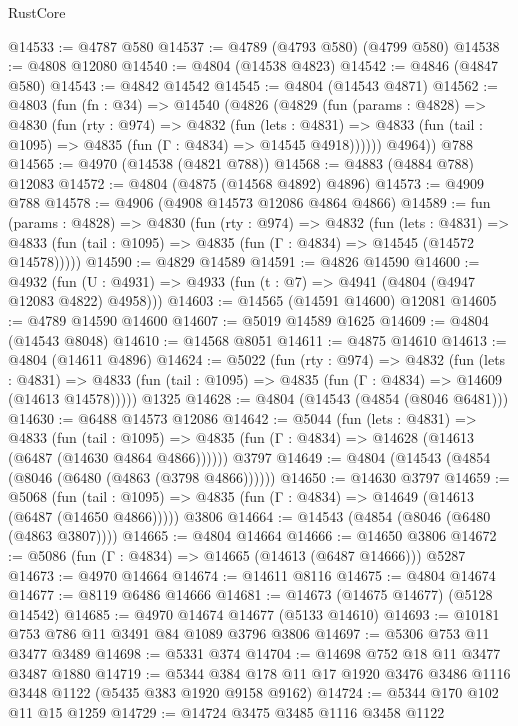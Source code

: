\begin{lexlean}{RustCore}
\begin{coremodule}
@14533 := @4787 @580
@14537 := @4789 (@4793 @580) (@4799 @580)
@14538 := @4808 @12080
@14540 := @4804 (@14538 @4823)
@14542 := @4846 (@4847 @580)
@14543 := @4842 @14542
@14545 := @4804 (@14543 @4871)
@14562 := @4803
    (fun (fn : @34) =>
    @14540
      (@4826
        (@4829
          (fun (params : @4828) =>
          @4830
            (fun (rty : @974) =>
            @4832
              (fun (lets : @4831) =>
              @4833 (fun (tail : @1095) => @4835 (fun (Γ : @4834) => @14545 @4918))))))
        @4964))
    @788
@14565 := @4970 (@14538 (@4821 @788))
@14568 := @4883 (@4884 @788) @12083
@14572 := @4804 (@4875 (@14568 @4892) @4896)
@14573 := @4909 @788
@14578 := @4906 (@4908 @14573 @12086 @4864 @4866)
@14589 := fun (params : @4828) =>
  @4830
    (fun (rty : @974) =>
    @4832
      (fun (lets : @4831) =>
      @4833 (fun (tail : @1095) => @4835 (fun (Γ : @4834) => @14545 (@14572 @14578)))))
@14590 := @4829 @14589
@14591 := @4826 @14590
@14600 := @4932
    (fun (U : @4931) => @4933 (fun (t : @7) => @4941 (@4804 (@4947 @12083 @4822) @4958)))
@14603 := @14565 (@14591 @14600) @12081
@14605 := @4789 @14590 @14600
@14607 := @5019 @14589 @1625
@14609 := @4804 (@14543 @8048)
@14610 := @14568 @8051
@14611 := @4875 @14610
@14613 := @4804 (@14611 @4896)
@14624 := @5022
    (fun (rty : @974) =>
    @4832
      (fun (lets : @4831) =>
      @4833 (fun (tail : @1095) => @4835 (fun (Γ : @4834) => @14609 (@14613 @14578)))))
    @1325
@14628 := @4804 (@14543 (@4854 (@8046 @6481)))
@14630 := @6488 @14573 @12086
@14642 := @5044
    (fun (lets : @4831) =>
    @4833
      (fun (tail : @1095) =>
      @4835 (fun (Γ : @4834) => @14628 (@14613 (@6487 (@14630 @4864 @4866))))))
    @3797
@14649 := @4804 (@14543 (@4854 (@8046 (@6480 (@4863 (@3798 @4866))))))
@14650 := @14630 @3797
@14659 := @5068
    (fun (tail : @1095) => @4835 (fun (Γ : @4834) => @14649 (@14613 (@6487 (@14650 @4866)))))
    @3806
@14664 := @14543 (@4854 (@8046 (@6480 (@4863 @3807))))
@14665 := @4804 @14664
@14666 := @14650 @3806
@14672 := @5086 (fun (Γ : @4834) => @14665 (@14613 (@6487 @14666))) @5287
@14673 := @4970 @14664
@14674 := @14611 @8116
@14675 := @4804 @14674
@14677 := @8119 @6486 @14666
@14681 := @14673 (@14675 @14677) (@5128 @14542)
@14685 := @4970 @14674 @14677 (@5133 @14610)
@14693 := @10181 @753 @786 @11 @3491 @84 @1089 @3796 @3806
@14697 := @5306 @753 @11 @3477 @3489
@14698 := @5331 @374
@14704 := @14698 @752 @18 @11 @3477 @3487 @1880
@14719 := @5344 @384 @178 @11 @17 @1920 @3476 @3486 @1116 @3448 @1122 (@5435 @383 @1920 @9158 @9162)
@14724 := @5344 @170 @102 @11 @15 @1259
@14729 := @14724 @3475 @3485 @1116 @3458 @1122

\end{coremodule}
\end{lexlean}
